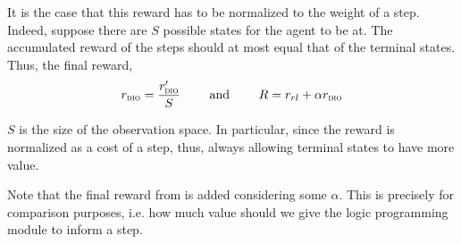 It is the case that this reward has to be normalized to the weight of a step. Indeed, suppose there are $S$ possible states for the agent to be at. 
The accumulated reward of the steps should at most equal that of the terminal states. Thus, the final reward, 
\[
  r_{\textsc{dio}{}} = \dfrac{r'_{\textsc{dio}{}}}{S} \qquad \text{ and } \qquad
  R = r_{rl} + \alpha r_{\textsc{dio}{}}
\]

$S$ is the size of the observation space. In particular, since the reward is normalized as a cost of a step, thus, 
always allowing terminal states to have more value. 

Note that the final reward from \dio{} is added considering some $\alpha$. This is precisely for comparison purposes, i.e. how much value should we give the logic programming module 
to inform a step. 

